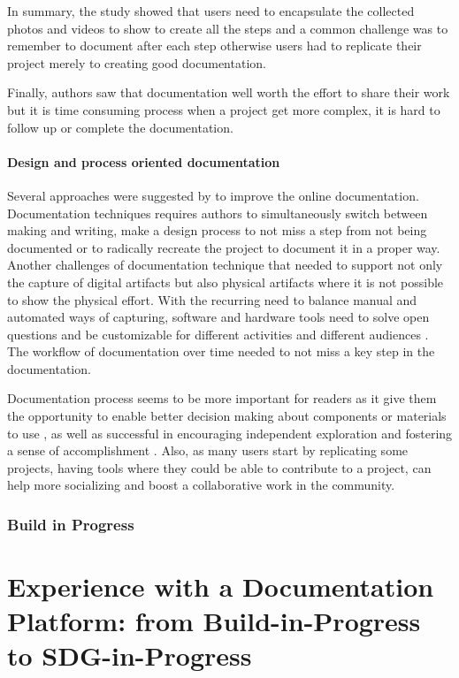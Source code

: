 In summary, the study showed that users need to encapsulate the collected photos and videos to show to create all the steps and a common challenge was to remember to document after each step otherwise users had to replicate their project merely to creating good documentation. 

Finally, authors saw that documentation well worth the effort to share their work but it is time consuming process when a project get more complex, it is hard to follow up or complete the documentation. \cite{scholar:Wakkary:2015:TAH:2702123.2702550}

\subsubsection{Design and process oriented documentation}
Several approaches were suggested by to improve the online documentation. Documentation techniques requires authors to simultaneously switch between making and writing, make a design process to not miss a step from not being documented or to radically recreate the project to document it in a proper way. Another challenges of documentation technique that needed to support not only the capture of digital artifacts but also physical artifacts where it is not possible to show the physical effort. 
With the recurring need to balance manual and automated ways of capturing, software and hardware tools need to solve open questions and be customizable for different activities and different audiences \cite{Kuznetsov:2010:REA:1868914.1868950}. The workflow of documentation over time needed to not miss a key step in the documentation. 

Documentation process seems to be more important for readers as it give them the opportunity to enable better decision making about components or materials to use \cite{scholar:sf1241364}, as well as successful in encouraging independent exploration and fostering a sense of accomplishment \cite{scholar:lovell2010sewing}. Also, as many users start by replicating some projects, having tools where they could be able to contribute to a project, can help more socializing and boost a collaborative work in the community. 
\subsection{Build in Progress}

\chapter{Experience with a Documentation Platform: from Build-in-Progress to SDG-in-Progress}


